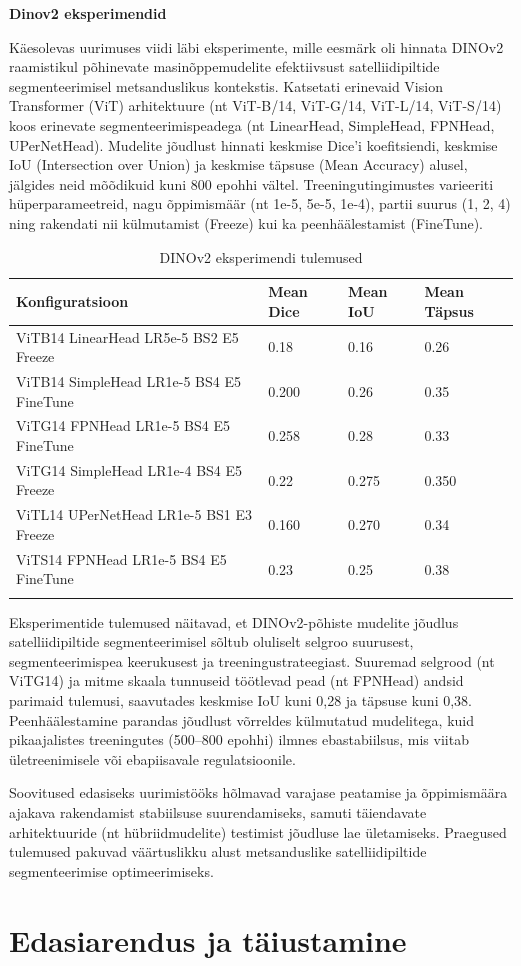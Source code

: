 \textbf{Dinov2 eksperimendid}

Käesolevas uurimuses viidi läbi eksperimente, mille eesmärk oli hinnata DINOv2
raamistikul põhinevate masinõppemudelite efektiivsust satelliidipiltide
segmenteerimisel metsanduslikus kontekstis. Katsetati erinevaid Vision
Transformer (ViT) arhitektuure (nt ViT-B/14, ViT-G/14, ViT-L/14, ViT-S/14) koos
erinevate segmenteerimispeadega (nt LinearHead, SimpleHead, FPNHead,
UPerNetHead). Mudelite jõudlust hinnati keskmise Dice'i koefitsiendi, keskmise
IoU (Intersection over Union) ja keskmise täpsuse (Mean Accuracy) alusel,
jälgides neid mõõdikuid kuni 800 epohhi vältel. Treeningutingimustes varieeriti
hüperparameetreid, nagu õppimismäär (nt 1e-5, 5e-5, 1e-4), partii suurus (1, 2,
4) ning rakendati nii külmutamist (Freeze) kui ka peenhäälestamist (FineTune).
\bigskip
\begin{longtable}{llll}
    \textbf{Konfiguratsioon} & \textbf{Mean Dice} & \textbf{Mean IoU} & \textbf{Mean Täpsus} \\
    \hline
    ViTB14 LinearHead LR5e-5 BS2 E5 Freeze & 0.18 & 0.16 & 0.26 \\
    ViTB14 SimpleHead LR1e-5 BS4 E5 FineTune & 0.200 & 0.26 & 0.35 \\
    ViTG14 FPNHead LR1e-5 BS4 E5 FineTune & 0.258 & 0.28 & 0.33 \\
    ViTG14 SimpleHead LR1e-4 BS4 E5 Freeze & 0.22 & 0.275 & 0.350 \\
    ViTL14 UPerNetHead LR1e-5 BS1 E3 Freeze & 0.160 & 0.270 & 0.34 \\
    ViTS14 FPNHead LR1e-5 BS4 E5 FineTune & 0.23 & 0.25 & 0.38 \\
    \hline
    \caption{DINOv2 eksperimendi tulemused}
    \label{tab:dinov2_results}
\end{longtable}
\bigskip

Eksperimentide tulemused näitavad, et DINOv2-põhiste mudelite jõudlus satelliidipiltide segmenteerimisel sõltub oluliselt selgroo suurusest, segmenteerimispea keerukusest ja treeningustrateegiast. Suuremad selgrood (nt ViTG14) ja mitme skaala tunnuseid töötlevad pead (nt FPNHead) andsid parimaid tulemusi, saavutades keskmise IoU kuni 0,28 ja täpsuse kuni 0,38. Peenhäälestamine parandas jõudlust võrreldes külmutatud mudelitega, kuid pikaajalistes treeningutes (500–800 epohhi) ilmnes ebastabiilsus, mis viitab ületreenimisele või ebapiisavale regulatsioonile.

Soovitused edasiseks uurimistööks hõlmavad varajase peatamise ja õppimismäära ajakava rakendamist stabiilsuse suurendamiseks, samuti täiendavate arhitektuuride (nt hübriidmudelite) testimist jõudluse lae ületamiseks. Praegused tulemused pakuvad väärtuslikku alust metsanduslike satelliidipiltide segmenteerimise optimeerimiseks.


\section{Edasiarendus ja täiustamine}
